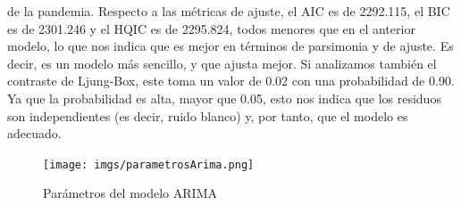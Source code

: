 \documentclass[a4paper,onecolumn]{extarticle}
\begin{document}
\begin{sloppypar}
de la pandemia. Respecto a las métricas de ajuste, el AIC es de 2292.115, el BIC es de 2301.246 y el HQIC es de 2295.824, todos menores que en el anterior modelo, 
lo que nos indica que es mejor en términos de parsimonia y de ajuste. Es decir, es un modelo más sencillo, y que ajusta mejor. Si analizamos también el contraste 
de Ljung-Box, este toma un valor de 0.02 con una probabilidad de 0.90. Ya que la probabilidad es alta, mayor que 0.05, esto nos indica que los residuos son 
independientes (es decir, ruido blanco) y, por tanto, que el modelo es adecuado.
\begin{center}
    \begin{figure}[h!]
        \centering
        \texttt{[image: imgs/parametrosArima.png]}
        \caption{Parámetros del modelo ARIMA} \label{fig:parametrosArima}
    \end{figure}
\end{center}


\end{sloppypar}
\end{document}
